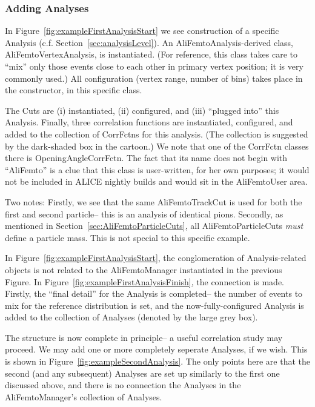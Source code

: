 \documentclass[twoside]{article}
\newcommand{\name}[1]{\textsf{#1}}%
\begin{document}
\subsubsection{Adding Analyses}


In Figure~\ref{fig:exampleFirstAnalysisStart} we see construction of a specific Analysis  (c.f.
Section~\ref{sec:analysisLevel}).
An \name{AliFemtoAnalysis}-derived class, \name{AliFemtoVertexAnalysis}, is
instantiated.  (For reference, this class takes care to ``mix'' only those events close to each other in
primary vertex position; it is very commonly used.)  All configuration (vertex range, number of bins) takes
place in the constructor, in this specific class.

The Cuts are (i) instantiated, (ii) configured, and (iii) ``plugged into'' this Analysis.
Finally, three correlation functions are instantiated, configured, and added to the collection
of CorrFctns for this analysis.  (The collection is suggested by the dark-shaded box in the cartoon.)
We note that one of the CorrFctn classes there is \name{OpeningAngleCorrFctn}.  The fact that its name
does not begin with ``AliFemto'' is a clue that this class is user-written, for her own purposes; it would
not be included in ALICE nightly builds and would sit in the AliFemtoUser area.

Two notes:  Firstly, we see that the same AliFemtoTrackCut is used for both the first and second particle-- this
is an analysis of identical pions.  Secondly, as mentioned in  Section~\ref{sec:AliFemtoParticleCuts}, all AliFemtoParticleCuts
{\it must} define a particle mass.  This is not special to this specific example.



In Figure~\ref{fig:exampleFirstAnalysisStart}, the conglomeration of Analysis-related objects is not related to
the AliFemtoManager instantiated in the previous Figure.  In Figure~\ref{fig:exampleFirstAnalysisFinish}, the connection
is made.  Firstly, the ``final detail'' for the Analysis is completed-- the number of events to mix for the reference
distribution is set, and the now-fully-configured Analysis is added to the collection of Analyses (denoted by the large
grey box).



The structure is now complete in principle-- a useful correlation study may proceed.
We may add one or more completely seperate Analyses, if we wish.  This is shown in
Figure~\ref{fig:exampleSecondAnalysis}.  The only points here are that the second
(and any subsequent) Analyses are set up similarly to the first one discussed above, and
there is no connection the Analyses in the AliFemtoManager's collection of Analyses.
\end{document}
